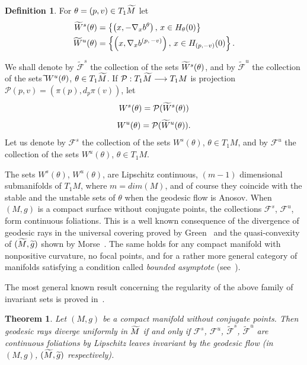 \documentclass[10pt]{amsart}
\newtheorem{theo}[cdrthm]{Theorem}
\theoremstyle{definition}
\newtheorem{defi}[cdrthm]{Definition}
\newcommand{\clF}{\mathcal{F}}
\newcommand{\clP}{\mathcal{P}}
\let\oldtilde\tilde
\renewcommand*{\tilde}[1]{\mathchoice{\widetilde{#1}}{\widetilde{#1}}{\oldtilde{#1}}{\oldtilde{#1}}}
\begin{document}
\begin{defi}\label{centerstable}
For $\theta = (p,v) \in T_{1}\tilde{M}$ let
\begin{align*}
\tilde{W}^{s}(\theta) &= \left\{\left(x, -\nabla_{x}b^{\theta}\right), \, x \in H_{\theta}(0) \right\}
\\
\tilde{W}^{u}(\theta) &= \left\{\left(x, \nabla_{x}b^{(p,\,-v)}\right), \, x \in H_{(p,-v)}(0)\right\}.
\end{align*}

We shall denote by $\widetilde{\clF}^{s}$ the collection of the sets $\tilde{W}^{s}(\theta)$, and by $\widetilde{\clF}^{u}$ the collection of the sets $\tilde{}W^{u}(\theta)$, $\theta \in T_{1}\tilde{M}$. If $\clP : T_{1}\tilde{M} \longrightarrow T_{1}M$ is projection $\clP(p,v) = (\pi(p), d_{p}\pi(v))$, let
\[
W^{s}(\theta) = \clP(\tilde{W}^{s}(\theta))
\]
\[
W^{u}(\theta) = \clP(\tilde{W}^{u}(\theta)).
\]
Let us denote by $\clF^{s}$ the collection of the sets $W^{s}(\theta)$, $\theta \in T_{1}M$, and by $\clF^{u}$ the collection of the sets $W^{u}(\theta)$, $\theta \in T_{1}M$.
\end{defi}

The sets $W^{s}(\theta)$, $W^{u}(\theta)$, are Lipschitz continuous, $(m-1)$ dimensional submanifolds of $T_{1}M$, where $m= dim(M)$, and of course they coincide with the stable and the unstable sets of $\theta$ when the geodesic flow is Anosov. When $(M,g)$ is a compact surface without conjugate points, the collections $\clF^{s}$, $\clF^{u}$, form continuous foliations. This is a well known consequence of the divergence of geodesic rays in the universal covering proved by Green~\cite{kn:Green} and the quasi-convexity of $(\tilde{M}, \tilde{g})$ shown by Morse~\cite{kn:Morse}. The same holds for any compact manifold with nonpositive curvature, no focal points, and for a rather more general category of manifolds satisfying a condition called \emph{bounded asymptote} (see~\cite{kn:Eschenburg}).

The most general known result concerning the regularity of the above family of invariant sets is proved in~\cite{kn:Ruggiero-Asterisque}.

\begin{theo}\label{divergence-continuity}
Let $(M,g)$ be a compact manifold without conjugate points. Then geodesic rays diverge uniformly in $\tilde{M}$ if and only if $\clF^{s}$, $\clF^{u}$, $\widetilde{\clF}^{s}$, $\widetilde{\clF}^{u}$ are continuous foliations by Lipschitz leaves invariant by the geodesic flow (in $(M,g)$, $(\tilde{M}, \tilde{g})$ respectively).
\end{theo}
\end{document}
